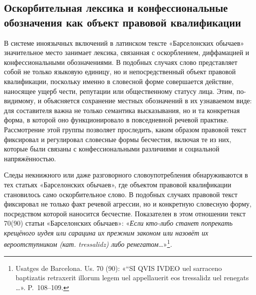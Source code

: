 \subsection{Оскорбительная лексика и конфессиональные обозначения как объект правовой квалификации}

В системе иноязычных включений в латинском тексте «Барселонских обычаев» значительное место занимает лексика, связанная с оскорблением, диффамацией и конфессиональными обозначениями. В подобных случаях слово представляет собой не только языковую единицу, но и непосредственный объект правовой квалификации, поскольку именно в словесной форме совершается действие, наносящее ущерб чести, репутации или общественному статусу лица. Этим, по-видимому, и объясняется сохранение местных обозначений в их узнаваемом виде: для составителя важна не только семантика высказывания, но и та конкретная форма, в которой оно функционировало в повседневной речевой практике. Рассмотрение этой группы позволяет проследить, каким образом правовой текст фиксировал и регулировал словесные формы бесчестия, включая те из них, которые были связаны с конфессиональными различиями и социальной напряжённостью.

Следы некнижного или даже разговорного словоупотребления обнаруживаются в тех статьях «Барселонских обычаев», где объектом правовой квалификации становилось само оскорбительное слово. В подобных случаях правовой текст фиксировал не только факт речевой агрессии, но и конкретную словесную форму, посредством которой наносится бесчестие. Показателен в этом отношении текст 70(90) статьи «Барселонских обычаев»: «\emph{Если кто-либо станет попрекать крещёного иудея или сарацина их прежним законом или назовёт их вероотступником (кат. tressalidz) либо ренегатом…}»\footnote{Usatges de Barcelona. Us. 70 (90): «“SI QVIS IVDEO uel sarraceno baptizatis retraxerit illorum legem uel appellauerit eos tressalidz uel renegats …». P.~108--109.}\emph{.}

